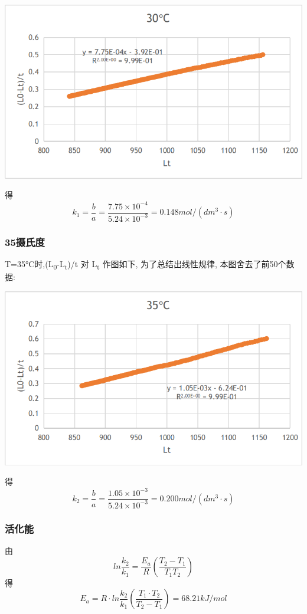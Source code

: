 \documentclass[11pt]{article}
\begin{document}
\begin{center}
\includegraphics[width=.9\linewidth]{../img/picture-30.png}
\end{center}

得
\[
k_{1}=\frac{b}{a}=\frac{7.75\times 10^{-4}}{5.24\times 10^{-3}}=0.148mol/(dm^{3}\cdot s)
\]
\subsubsection{35摄氏度}
\label{sec:orgbcf5a1a}
T=35°C时,(L\textsubscript{0}-L\textsubscript{t})/t 对 L\textsubscript{t} 作图如下, 为了总结出线性规律, 本图舍去了前50个数据:
\begin{center}
\includegraphics[width=.9\linewidth]{../img/picture-35.png}
\end{center}

得
\[
k_{2}=\frac{b}{a}=\frac{1.05\times 10^{-3}}{5.24\times 10^{-3}}=0.200mol/(dm^{3}\cdot s)
\]

\subsubsection{活化能}
\label{sec:org4c7c8e2}

由
\[
ln\frac{k_{2}}{k_{1}}=\frac{E_{a}}{R}(\frac{T_{2}-T_{1}}{T_{1}T_{2}})
\]
得
\[
E_{a}=R\cdot ln\frac{k_{2}}{k_{1}}(\frac{T_{1}\cdot T_{2}}{T_{2}-T_{1}})=68.21kJ/mol
\]
\end{document}
